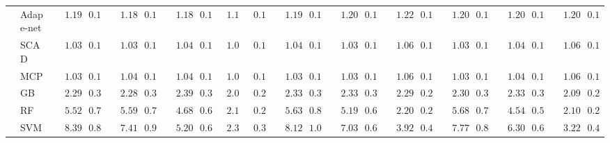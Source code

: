 \begin{tabular}{llllllllllllllllllllll}
	& Adap e-net  & $\phantom{00}1.192$ & $\phantom{0}0.160$ & $\phantom{00}1.186$ & $\phantom{0}0.145$ & $\phantom{00}1.187$ & $\phantom{0}0.139$ & $\phantom{0}1.188$ & $\phantom{0}0.146$ & $\phantom{00}1.193$ & $\phantom{0}0.156$ & $\phantom{00}1.209$ & $\phantom{0}0.141$ & $\phantom{00}1.228$ & $\phantom{0}0.148$ & $\phantom{00}1.207$ & $\phantom{0}0.138$ & $\phantom{00}1.201$ & $\phantom{0}0.149$ & $\phantom{00}1.207$ & $\phantom{0}0.145$ \\
	& SCAD  & $\phantom{00}1.036$ & $\phantom{0}0.117$ & $\phantom{00}1.039$ & $\phantom{0}0.110$ & $\phantom{00}1.044$ & $\phantom{0}0.130$ & $\phantom{0}1.061$ & $\phantom{0}0.125$ & $\phantom{00}1.040$ & $\phantom{0}0.111$ & $\phantom{00}1.037$ & $\phantom{0}0.112$ & $\phantom{00}1.064$ & $\phantom{0}0.113$ & $\phantom{00}1.038$ & $\phantom{0}0.112$ & $\phantom{00}1.046$ & $\phantom{0}0.136$ & $\phantom{00}1.062$ & $\phantom{0}0.117$ \\
	& MCP  & $\phantom{00}1.034$ & $\phantom{0}0.117$ & $\phantom{00}1.042$ & $\phantom{0}0.111$ & $\phantom{00}1.047$ & $\phantom{0}0.128$ & $\phantom{0}1.056$ & $\phantom{0}0.120$ & $\phantom{00}1.036$ & $\phantom{0}0.110$ & $\phantom{00}1.034$ & $\phantom{0}0.108$ & $\phantom{00}1.062$ & $\phantom{0}0.118$ & $\phantom{00}1.036$ & $\phantom{0}0.110$ & $\phantom{00}1.048$ & $\phantom{0}0.127$ & $\phantom{00}1.068$ & $\phantom{0}0.123$ \\
	& GB  & $\phantom{00}2.292$ & $\phantom{0}0.342$ & $\phantom{00}2.286$ & $\phantom{0}0.330$ & $\phantom{00}2.390$ & $\phantom{0}0.378$ & $\phantom{0}2.056$ & $\phantom{0}0.254$ & $\phantom{00}2.331$ & $\phantom{0}0.372$ & $\phantom{00}2.339$ & $\phantom{0}0.333$ & $\phantom{00}2.292$ & $\phantom{0}0.273$ & $\phantom{00}2.309$ & $\phantom{0}0.324$ & $\phantom{00}2.331$ & $\phantom{0}0.371$ & $\phantom{00}2.098$ & $\phantom{0}0.257$ \\
	& RF  & $\phantom{00}5.521$ & $\phantom{0}0.774$ & $\phantom{00}5.599$ & $\phantom{0}0.783$ & $\phantom{00}4.680$ & $\phantom{0}0.600$ & $\phantom{0}2.188$ & $\phantom{0}0.241$ & $\phantom{00}5.633$ & $\phantom{0}0.824$ & $\phantom{00}5.196$ & $\phantom{0}0.624$ & $\phantom{00}2.200$ & $\phantom{0}0.229$ & $\phantom{00}5.680$ & $\phantom{0}0.759$ & $\phantom{00}4.546$ & $\phantom{0}0.556$ & $\phantom{00}2.105$ & $\phantom{0}0.214$ \\
	& SVM  & $\phantom{00}8.394$ & $\phantom{0}0.843$ & $\phantom{00}7.412$ & $\phantom{0}0.908$ & $\phantom{00}5.208$ & $\phantom{0}0.655$ & $\phantom{0}2.308$ & $\phantom{0}0.341$ & $\phantom{00}8.123$ & $\phantom{0}1.018$ & $\phantom{00}7.038$ & $\phantom{0}0.625$ & $\phantom{00}3.927$ & $\phantom{0}0.468$ & $\phantom{00}7.777$ & $\phantom{0}0.877$ & $\phantom{00}6.300$ & $\phantom{0}0.627$ & $\phantom{00}3.228$ & $\phantom{0}0.436$ \\

\end{tabular}
